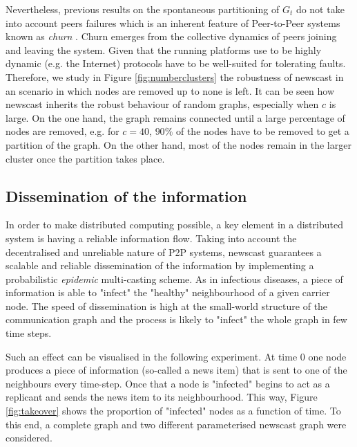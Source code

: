 Nevertheless, previous results on the spontaneous partitioning of $G_t$ do not take into account peers failures which is an inherent feature of Peer-to-Peer systems known as \emph{churn} \cite{Stutzbach06Understanding}. Churn emerges from the collective dynamics of peers joining and leaving the system. Given that the running platforms use to be highly dynamic (e.g. the Internet) protocols have to be well-suited for tolerating faults. Therefore, we study in Figure \ref{fig:numberclusters} the robustness of newscast in an scenario in which nodes are removed up to none is left. It can be seen how newscast inherits the robust behaviour of random graphs, especially when $c$ is large. On the one hand, the graph remains connected until a large percentage of nodes are removed, e.g. for $c=40$, $90\%$ of the nodes have to be removed to get a partition of the graph. On the other hand, most of the nodes remain in the larger cluster once the partition takes place. 



\subsection{Dissemination of the information}
\label{sec:informationdissemination}

In order to make distributed computing possible, a key element in a distributed system is having a reliable information flow. Taking into account the decentralised and unreliable nature of P2P systems, newscast guarantees a scalable and reliable dissemination of the information by implementing a probabilistic \emph{epidemic} multi-casting scheme. As in infectious diseases, a piece of information is able to "infect" the "healthy" neighbourhood of a given carrier node. The speed of dissemination is high at the small-world structure of the communication graph and the process is likely to "infect" the whole graph in few time steps.

Such an effect can be visualised in the following experiment. At time $0$ one node produces a piece of information (so-called a news item) that is sent to one of the neighbours every time-step. Once that a node is "infected" begins to act as a replicant and sends the news item to its neighbourhood. This way, Figure \ref{fig:takeover} shows the proportion of "infected" nodes as a function of time. To this end, a complete graph and two different parameterised newscast graph were considered. 

